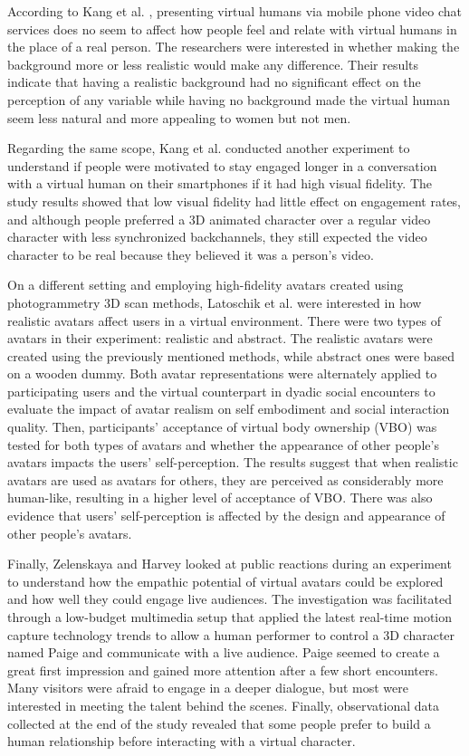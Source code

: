 According to Kang et al. \cite{KAN16}, presenting virtual humans via mobile phone video chat services does no seem to affect how people feel and relate with virtual humans in the place of a real person. The researchers were interested in whether making the background more or less realistic would make any difference. Their results indicate that having a realistic background had no significant effect on the perception of any variable while having no background made the virtual human seem less natural and more appealing to women but not men.

Regarding the same scope, Kang et al. \cite{KAN16A} conducted another experiment to understand if people were motivated to stay engaged longer in a conversation with a virtual human on their smartphones if it had high visual fidelity. The study results showed that low visual fidelity had little effect on engagement rates, and although people preferred a 3D animated character over a regular video character with less synchronized backchannels, they still expected the video character to be real because they believed it was a person's video.

On a different setting and employing high-fidelity avatars created using photogrammetry 3D scan methods, Latoschik et al. \cite{LAT17} were interested in how realistic avatars affect users in a virtual environment. There were two types of avatars in their experiment: realistic and abstract. The realistic avatars were created using the previously mentioned methods, while abstract ones were based on a wooden dummy. Both avatar representations were alternately applied to participating users and the virtual counterpart in dyadic social encounters to evaluate the impact of avatar realism on self embodiment and social interaction quality. Then, participants' acceptance of virtual body ownership (VBO) was tested for both types of avatars and whether the appearance of other people's avatars impacts the users' self-perception. The results suggest that when realistic avatars are used as avatars for others, they are perceived as considerably more human-like, resulting in a higher level of acceptance of VBO. There was also evidence that users' self-perception is affected by the design and appearance of other people's avatars.

Finally, Zelenskaya and Harvey \cite{ZEL19} looked at public reactions during an experiment to understand how the empathic potential of virtual avatars could be explored and how well they could engage live audiences. The investigation was facilitated through a low-budget multimedia setup that applied the latest real-time motion capture technology trends to allow a human performer to control a 3D character named Paige and communicate with a live audience. Paige seemed to create a great first impression and gained more attention after a few short encounters. Many visitors were afraid to engage in a deeper dialogue, but most were interested in meeting the talent behind the scenes. Finally, observational data collected at the end of the study revealed that some people prefer to build a human relationship before interacting with a virtual character.

